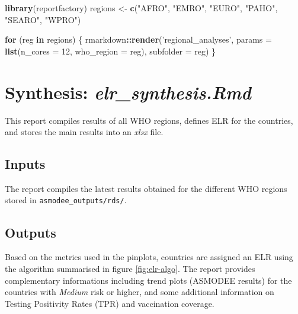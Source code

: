 \documentclass[]{book}
\newenvironment{Shaded}{\begin{snugshade}}{\end{snugshade}}
\newcommand{\ControlFlowTok}[1]{\textcolor[rgb]{0.13,0.29,0.53}{\textbf{#1}}}
\newcommand{\DataTypeTok}[1]{\textcolor[rgb]{0.13,0.29,0.53}{#1}}
\newcommand{\DecValTok}[1]{\textcolor[rgb]{0.00,0.00,0.81}{#1}}
\newcommand{\KeywordTok}[1]{\textcolor[rgb]{0.13,0.29,0.53}{\textbf{#1}}}
\newcommand{\NormalTok}[1]{#1}
\newcommand{\OperatorTok}[1]{\textcolor[rgb]{0.81,0.36,0.00}{\textbf{#1}}}
\newcommand{\StringTok}[1]{\textcolor[rgb]{0.31,0.60,0.02}{#1}}
\begin{document}
\begin{Shaded}
\begin{Highlighting}[]

\KeywordTok{library}\NormalTok{(reportfactory)}
\NormalTok{regions <-}\StringTok{ }\KeywordTok{c}\NormalTok{(}\StringTok{"AFRO"}\NormalTok{, }\StringTok{"EMRO"}\NormalTok{, }\StringTok{"EURO"}\NormalTok{, }\StringTok{"PAHO"}\NormalTok{, }\StringTok{"SEARO"}\NormalTok{, }\StringTok{"WPRO"}\NormalTok{)}

\ControlFlowTok{for}\NormalTok{ (reg }\ControlFlowTok{in}\NormalTok{ regions) \{}
\NormalTok{rmarkdown}\OperatorTok{::}\KeywordTok{render}\NormalTok{(}\StringTok{'regional_analyses'}\NormalTok{,}
                  \DataTypeTok{params =} \KeywordTok{list}\NormalTok{(}\DataTypeTok{n_cores =} \DecValTok{12}\NormalTok{, }\DataTypeTok{who_region =}\NormalTok{ reg),}
                  \DataTypeTok{subfolder =}\NormalTok{ reg)}
\NormalTok{\}}
\end{Highlighting}
\end{Shaded}

\hypertarget{synthesis-elr_synthesis.rmd}{%
\section{\texorpdfstring{Synthesis: \emph{elr\_synthesis.Rmd}}{Synthesis: elr\_synthesis.Rmd}}\label{synthesis-elr_synthesis.rmd}}

This report compiles results of all WHO regions, defines ELR for the countries,
and stores the main results into an \emph{xlsx} file.

\hypertarget{inputs-2}{%
\subsection{Inputs}\label{inputs-2}}

The report compiles the latest results obtained for the different WHO regions
stored in \texttt{asmodee\_outputs/rds/}.

\hypertarget{outputs-2}{%
\subsection{Outputs}\label{outputs-2}}

Based on the metrics used in the pinplots, countries are assigned an ELR using
the algorithm summarised in figure \ref{fig:elr-algo}. The report provides
complementary informations including trend plots (ASMODEE results) for the
countries with \emph{Medium} risk or higher, and some additional information on
Testing Positivity Rates (TPR) and vaccination coverage.
\end{document}

